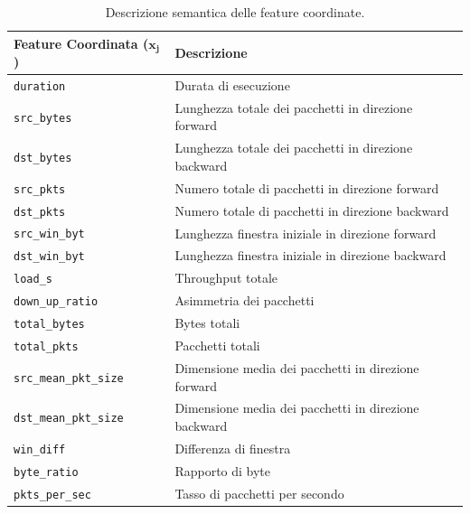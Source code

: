 \begin{table}[H]
    \centering
    \small
    \caption{Descrizione semantica delle feature coordinate.}
    \label{tab:feature_descriptions}
    \begin{tabularx}{\textwidth}{l >{\raggedright\arraybackslash}X}
        \toprule
        \textbf{Feature Coordinata ($\mathbf{x_j}$)} & \textbf{Descrizione} \\
        \midrule
        \texttt{duration} & Durata di esecuzione \\
        \texttt{src\_bytes} & Lunghezza totale dei pacchetti in direzione forward \\
        \texttt{dst\_bytes} & Lunghezza totale dei pacchetti in direzione backward \\
        \texttt{src\_pkts} & Numero totale di pacchetti in direzione forward \\
        \texttt{dst\_pkts} & Numero totale di pacchetti in direzione backward \\
        \texttt{src\_win\_byt} & Lunghezza finestra iniziale in direzione forward \\
        \texttt{dst\_win\_byt} & Lunghezza finestra iniziale in direzione backward \\
        \texttt{load\_s} & Throughput totale \\
        \texttt{down\_up\_ratio} & Asimmetria dei pacchetti \\
        \texttt{total\_bytes} & Bytes totali \\
        \texttt{total\_pkts} & Pacchetti totali \\
        \texttt{src\_mean\_pkt\_size} & Dimensione media dei pacchetti in direzione forward \\
        \texttt{dst\_mean\_pkt\_size} & Dimensione media dei pacchetti in direzione backward \\
        \texttt{win\_diff} & Differenza di finestra \\
        \texttt{byte\_ratio} & Rapporto di byte \\
        \texttt{pkts\_per\_sec} & Tasso di pacchetti per secondo \\
        \bottomrule
    \end{tabularx}
\end{table}

